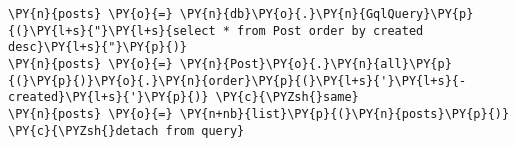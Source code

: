 \begin{Verbatim}[commandchars=\\\{\}]
\PY{n}{posts} \PY{o}{=} \PY{n}{db}\PY{o}{.}\PY{n}{GqlQuery}\PY{p}{(}\PY{l+s}{"}\PY{l+s}{select * from Post order by created desc}\PY{l+s}{"}\PY{p}{)}
\PY{n}{posts} \PY{o}{=} \PY{n}{Post}\PY{o}{.}\PY{n}{all}\PY{p}{(}\PY{p}{)}\PY{o}{.}\PY{n}{order}\PY{p}{(}\PY{l+s}{'}\PY{l+s}{-created}\PY{l+s}{'}\PY{p}{)} \PY{c}{\PYZsh{}same}
\PY{n}{posts} \PY{o}{=} \PY{n+nb}{list}\PY{p}{(}\PY{n}{posts}\PY{p}{)} \PY{c}{\PYZsh{}detach from query}
\end{Verbatim}
